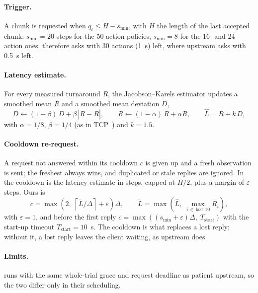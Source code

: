 \paragraph{Trigger.} A chunk is requested when $q_t \le H - s_{\min}$, with $H$ the length of the last accepted chunk:
$s_{\min}=20$ steps for the 50-action policies, $s_{\min}=8$ for the 16- and 24-action ones. \smolvla{} therefore
asks with 30 actions (1~s) left, where upstream asks with 0.5~s left.

\paragraph{Latency estimate.} For every measured turnaround $R$, the Jacobson--Karels estimator updates a smoothed mean
$\bar R$ and a smoothed mean deviation $D$,
\begin{equation}
  D \leftarrow (1-\beta)\,D + \beta\,|R-\bar R|, \qquad \bar R \leftarrow (1-\alpha)\,\bar R + \alpha R, \qquad
  \hat L = \bar R + k\,D,
\end{equation}
with $\alpha=1/8$, $\beta=1/4$ (as in TCP~\cite{rfc6298}) and $k=1.5$.

\paragraph{Cooldown re-request.} A request not answered within its cooldown $c$ is given up and a fresh observation is
sent; the freshest always wins, and duplicated or stale replies are ignored. In \drtc{} the cooldown is the latency
estimate in steps, capped at $H/2$, plus a margin of $\varepsilon$ steps. Ours is
\begin{equation}
  c = \max\!\left(2,\; \left\lceil \tilde L / \Delta \right\rceil + \varepsilon\right)\Delta, \qquad
  \tilde L = \max\!\left(\hat L,\; \max_{i\,\in\,\text{last 10}} R_i\right),
\end{equation}
with $\varepsilon = 1$, and before the first reply $c = \max\!\left((s_{\min}+\varepsilon)\Delta,\;
T_{\mathrm{start}}\right)$ with the start-up timeout $T_{\mathrm{start}}=10$~s. The cooldown is what replaces a lost
reply; without it, a lost reply leaves the client waiting, as upstream does.

\paragraph{Limits.} \drtc{} runs with the same whole-trial grace and request deadline as patient upstream, so the two
differ only in their scheduling.

